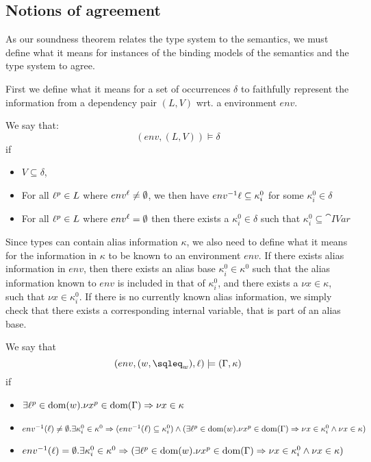 \documentclass{eptcs}
\begin{document}
\subsection{Notions of agreement}

As our soundness theorem relates the type system to the semantics, we
must define what it means for instances of the binding models of the
semantics and the type system to agree.

First we define what it means for a set of occurrences $\delta$ to
faithfully represent the information from a dependency pair $(L,V)$
wrt. a environment $env$.

\begin{definition}\label{def:DepAgree}
	We say that:
	$$(env,(L,V))\models\delta$$
	if
	\begin{itemize}
		\item $V\subseteq\delta$,
		\item For all $\ell^p\in L$ where
                  $env^{\ell}\neq\emptyset$, we then have $env^{-1} \ell \subseteq \kappa_i^0$ for some $\kappa_i^0\in\delta$
		\item For all $\ell^p\in L$ where $env^{\ell}=\emptyset$ then there exists a $\kappa_i^0\in\delta$ such that $\kappa_i^0\subseteq\cat{IVar}$
	\end{itemize}
      \end{definition}

      Since types can contain alias information $\kappa$, we also need
      to define what it means for the information in $\kappa$ to be
      known to an environment $env$.  If there exists alias
      information in $env$, then there exists an alias base
      $\kappa^0_i\in\kappa^0$ such that the alias information known to
      $env$ is included in that of $\kappa^0_i$, and there exists a
      $\nu x\in\kappa$, such that $\nu x\in \kappa^0_i$.  If there is
      no currently known alias information, we simply check that there
      exists a corresponding internal variable, that is part of an
      alias base.

      \begin{definition}\label{def:AliasAgree}
	We say that
	$$(env,(w,\sqleq_w),\loc)\models(\Gamma,\kappa)$$
	if
	\begin{itemize}
		\item $\exists \ell^p\in \textrm{dom}(w).\nu x^p\in \textrm{dom}(\Gamma)\Rightarrow\nu x\in\kappa$
		\item $env^{-1}(\ell)\neq\emptyset.\exists \kappa^0_i\in\kappa^0\Rightarrow
			(env^{-1}(\ell)\subseteq\kappa^0_i)\wedge(\exists \ell^p\in \textrm{dom}(w).\nu x^p\in \textrm{dom}(\Gamma)\Rightarrow\nu x\in\kappa^0_i\wedge\nu x\in\kappa)$
		\item $env^{-1}(\ell)=\emptyset.\exists \kappa^0_i\in\kappa^0\Rightarrow
			(\exists \ell^p\in \textrm{dom}(w).\nu x^p\in \textrm{dom}(\Gamma)\Rightarrow\nu x\in\kappa^0_i\wedge\nu x\in\kappa)$
	\end{itemize}
\end{definition}
\end{document}
